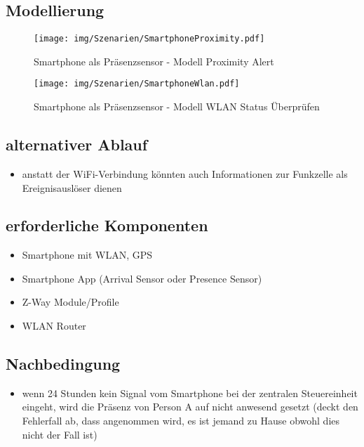 \subsection{Modellierung}
\begin{figure}[h!]
	\centering
	\texttt{[image: img/Szenarien/SmartphoneProximity.pdf]}
	\caption{Smartphone als Präsenzsensor - Modell Proximity Alert}
	\label{fig:szenarienSmartphoneProximity}
\end{figure}

\begin{figure}[h!]
	\centering
	\texttt{[image: img/Szenarien/SmartphoneWlan.pdf]}
	\caption{Smartphone als Präsenzsensor - Modell WLAN Status Überprüfen}
	\label{fig:szenarienSmartphoneWlan}
\end{figure}

\subsection{alternativer Ablauf}
\begin{itemize}
	\item anstatt der WiFi-Verbindung könnten auch Informationen zur Funkzelle als Ereignisauslöser dienen
\end{itemize}

\subsection{erforderliche Komponenten}
\begin{itemize}
	\item Smartphone mit WLAN, GPS
	\item Smartphone App (Arrival Sensor oder Presence Sensor)
	\item Z-Way Module/Profile
	\item WLAN Router
\end{itemize}

\subsection{Nachbedingung}
\begin{itemize}
	\item wenn 24 Stunden kein Signal vom Smartphone bei der zentralen Steuereinheit eingeht, wird die Präsenz von Person A auf nicht anwesend gesetzt (deckt den Fehlerfall ab, dass angenommen wird, es ist jemand zu Hause obwohl dies nicht der Fall ist)
\end{itemize}

